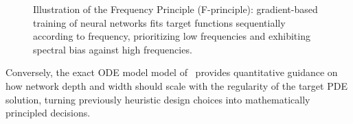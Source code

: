 \begin{figure}[H]
  \centering
  \vspace{-1.5em}
  \caption{Illustration of the Frequency Principle (F-principle): gradient-based training of neural networks fits target functions sequentially according to frequency, prioritizing low frequencies and exhibiting spectral bias against high frequencies.}
  \label{fig:f-principle}
\end{figure}

Conversely, the exact ODE model
model of~\cite{Luo2022} provides quantitative guidance on how network depth
and width should scale with the regularity of the target PDE solution, turning
previously heuristic design choices into mathematically principled decisions.
